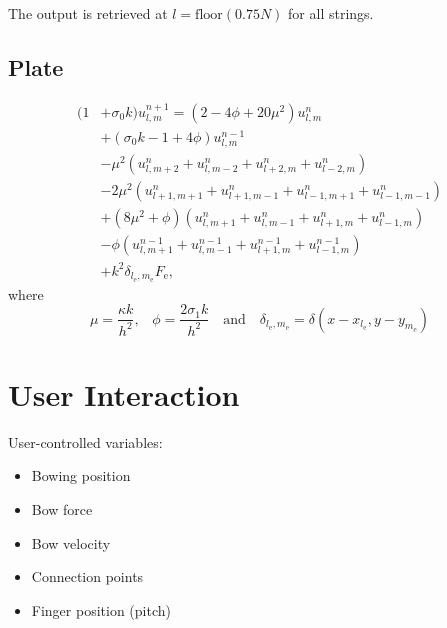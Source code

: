 \documentclass{article}
\begin{document}
The output is retrieved at $l = \text{floor}(0.75N)$ for all strings.

\subsection{Plate}
\begin{equation}
    \begin{aligned}\label{eq:plateImplementation}
        (1& + \sigma_0k)u_{l,m}^{n+1} = (2 - 4\phi + 20\mu^2)u_{l,m}^n\\
    &+ (\sigma_0 k - 1 + 4\phi) u_{l,m}^{n-1}\\
    &-\mu^2 (u_{l,m + 2}^n + u_{l,m - 2}^n + u_{l + 2,m}^n + u_{l - 2,m}^n)\\
    &- 2\mu^2(u_{l + 1,m + 1}^n + u_{l + 1,m - 1}^n + u_{l - 1,m + 1}^n + u_{l - 1,m - 1}^n)\\
    &+ (8\mu^2 + \phi)(u_{l,m + 1}^n + u_{l,m - 1}^n + u_{l + 1,m}^n + u_{l - 1,m}^n)\\
    &- \phi(u_{l,m + 1}^{n-1} + u_{l,m - 1}^{n-1} + u_{l + 1,m}^{n-1} + u_{l - 1,m}^{n-1})\\
    &+ k^2 \delta_{l_\text{e}, m_\text{e}}F_\text{e},
\end{aligned}
\end{equation}
where
\begin{equation}\nonumber
    \mu = \frac{\kappa k}{h^2} \text{,} \quad \phi = \frac{2\sigma_1k}{h^2} \quad \text{and} \quad \delta_{l_\text{e}, m_\text{e}} = \delta(x - x_{l_\text{e}}, y - y_{m_\text{e}})
\end{equation}

\section{User Interaction}
User-controlled variables:
\begin{itemize}
    \item Bowing position
    \item Bow force
    \item Bow velocity
    \item Connection points
    \item Finger position (pitch)
\end{itemize}
\end{document}
